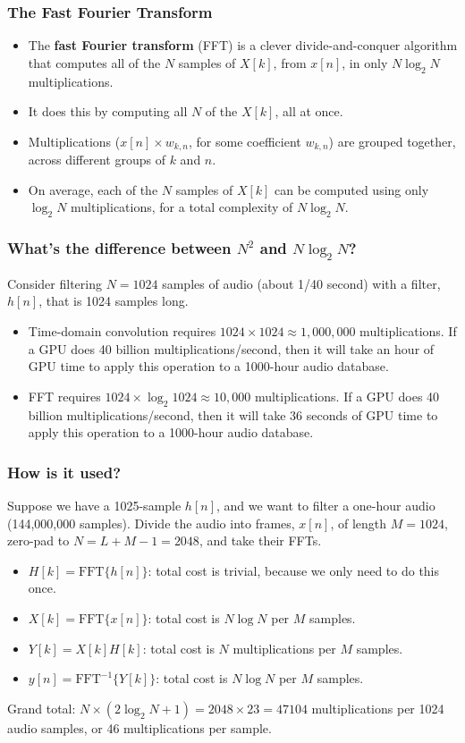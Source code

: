 \documentclass{beamer}
\begin{document}
\begin{frame}
  \frametitle{The Fast Fourier Transform}

  \begin{itemize}
    \item The {\bf fast Fourier transform} (FFT) is a clever
      divide-and-conquer algorithm that computes all of the $N$
      samples of $X[k]$, from $x[n]$, in only $N\log_2 N$
      multiplications.
    \item It does this by computing all $N$ of the $X[k]$, all at
      once.
    \item Multiplications ($x[n] \times w_{k,n}$, for some coefficient
      $w_{k,n}$) are grouped together, across different groups of $k$
      and $n$.
    \item On average, each of the $N$ samples of $X[k]$ can be
      computed using only $\log_2 N$ multiplications, for a total
      complexity of $N\log_2 N$.
  \end{itemize}
\end{frame}

\begin{frame}
  \frametitle{What's the difference between $N^2$ and $N\log_2 N$?}

  Consider filtering $N=1024$ samples of audio (about 1/40 second)
  with a filter, $h[n]$, that is 1024 samples long.
  \begin{itemize}
  \item Time-domain convolution requires $1024\times 1024\approx
    1,000,000$ multiplications.  If a GPU does 40 billion
    multiplications/second, then it will take an hour of GPU time to
    apply this operation to a 1000-hour audio database.
  \item FFT requires $1024\times \log_2 1024\approx 10,000$
    multiplications.  If a GPU does 40 billion multiplications/second,
    then it will take 36 seconds of GPU time to apply this operation
    to a 1000-hour audio database.
  \end{itemize}
\end{frame}

\begin{frame}
  \frametitle{How is it used?}

  Suppose we have a 1025-sample $h[n]$, and we want to filter a
  one-hour audio (144,000,000 samples).  Divide the audio into frames,
  $x[n]$, of length $M=1024$, zero-pad to $N=L+M-1=2048$, and take
  their FFTs.
  \begin{itemize}
  \item $H[k]=\text{FFT}\{h[n]\}$: total cost is trivial, because we
    only need to do this once.
  \item $X[k]=\text{FFT}\{x[n]\}$: total cost is $N\log N$ per $M$ samples.
  \item $Y[k]=X[k]H[k]$: total cost is $N$ multiplications per $M$ samples.
  \item $y[n]=\text{FFT}^{-1}\{Y[k]\}$: total cost is $N\log N$ per
    $M$ samples.
  \end{itemize}
  Grand total: $N\times\left(2\log_2N+1\right)=2048\times 23=47104$
  multiplications per 1024 audio samples, or 46 multiplications per
  sample.
\end{frame}
  
\end{document}
